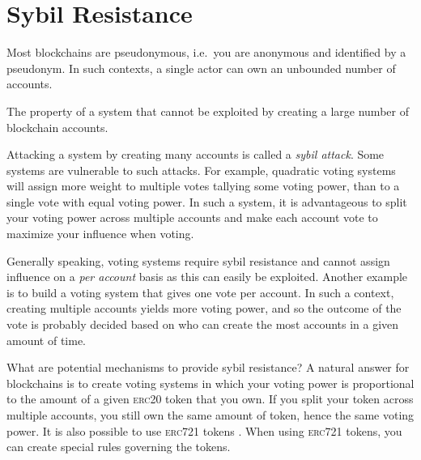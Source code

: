 \section{Sybil Resistance}
\label{sec:sybil_resistance}

Most blockchains are pseudonymous, i.e.\ you are anonymous and identified by a pseudonym.
In such contexts, a single actor can own an unbounded number of accounts.

\begin{definition}
  The property of a system that cannot be exploited by creating a large number of blockchain accounts.
\end{definition}

Attacking a system by creating many accounts is called a \textit{sybil attack}.
Some systems are vulnerable to such attacks.
For example, quadratic voting systems will assign more weight to multiple votes tallying some voting power, than to a single vote with equal voting power.
In such a system, it is advantageous to split your voting power across multiple accounts and make each account vote to maximize your influence when voting.

Generally speaking, voting systems require sybil resistance and cannot assign influence on a \textit{per account} basis as this can easily be exploited.
Another example is to build a voting system that gives one vote per account.
In such a context, creating multiple accounts yields more voting power, and so the outcome of the vote is probably decided based on who can create the most accounts in a given amount of time.

What are potential mechanisms to provide sybil resistance?
A natural answer for blockchains is to create voting systems in which your voting power is proportional to the amount of a given \textsc{erc20} token%
that you own.
If you split your token across multiple accounts, you still own the same amount of token, hence the same voting power.
It is also possible to use \textsc{erc721} tokens%
.
When using \textsc{erc721} tokens, you can create special rules governing the tokens.

